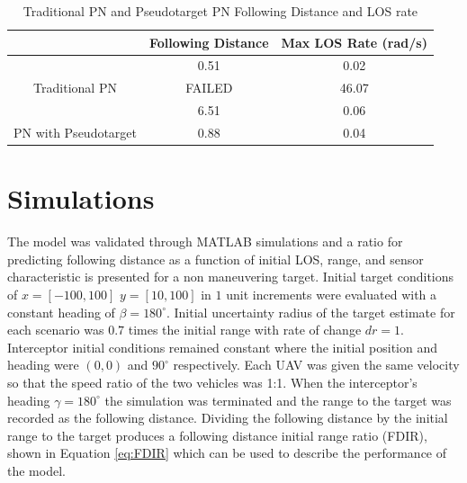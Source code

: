 \documentclass[conference]{IEEEtran}
\begin{document}

\begin{table}[H]
	\centering
	\caption{Traditional PN and Pseudotarget PN Following Distance and LOS rate}
	\label{my-label}
	\begin{tabular}{c|c|c|}
		\cline{2-3}
		\multicolumn{1}{l|}{}                                        & \multicolumn{1}{l|}{Following Distance} & \multicolumn{1}{l|}{Max LOS Rate (rad/s)} \\ \hline
		\multicolumn{1}{|c|}{}                                       & 0.51                                    & 0.02                                      \\ \cline{2-3} 
		\multicolumn{1}{|c|}{\multirow{-2}{*}{Traditional PN}}       & \cellcolor[HTML]{C0C0C0} FAILED         & 46.07                                     \\ \hline
		\multicolumn{1}{|c|}{}                                       & 6.51                                    & 0.06                                      \\ \cline{2-3} 
		\multicolumn{1}{|c|}{\multirow{-2}{*}{PN with Pseudotarget}} & 0.88                                    & 0.04                                      \\ \hline
	\end{tabular}
\end{table}

\section{Simulations}
The model was validated through MATLAB simulations and a ratio for predicting following distance as a function of initial LOS, range, and sensor characteristic is presented for a non maneuvering target. Initial target conditions of $x = [-100,100]$ $y = [10,100]$ in $1$ unit increments were evaluated with a constant heading of $\beta = 180^{\circ}$. Initial uncertainty radius of the target estimate for each scenario was $0.7$ times the initial range with rate of change $dr = 1$. Interceptor initial conditions remained constant where the initial position and heading were $(0,0)$ and $90^{\circ}$ respectively. Each UAV was given the same velocity so that the speed ratio of the two vehicles was 1:1. When the interceptor's heading $\gamma = 180^{\circ}$ the simulation was terminated and the range to the target was recorded as the following distance. Dividing the following distance by the initial range to the target produces a following distance initial range ratio (FDIR), shown in Equation \ref{eq:FDIR} which can be used to describe the performance of the model.
\end{document}
